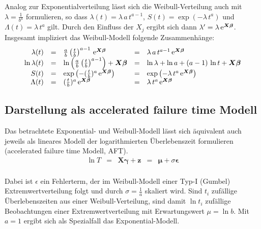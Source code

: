 Analog zur Exponentialverteilung lässt sich die Weibull-Verteilung auch mit $\lambda = \frac{1}{b^{a}}$ formulieren, so dass $\lambda(t) = \lambda \, a \, t^{a-1}$, $S(t) = \exp(-\lambda \, t^{a})$ und $\Lambda(t) = \lambda \, t^{a}$ gilt. Durch den Einfluss der $X_{j}$ ergibt sich dann $\lambda' = \lambda \, {\mathrm{e}}^{\bm{X} \bm{\beta}}$. Insgesamt impliziert das Weibull-Modell folgende Zusammenhänge:
\begin{equation*}
\begin{array}{rclcl}
\lambda(t)     &=& \frac{a}{b} \left(\frac{t}{b}\right)^{a-1} \, {\mathrm{e}}^{\bm{X} \bm{\beta}} &=& \lambda \, a \, t^{a-1} \, {\mathrm{e}}^{\bm{X} \bm{\beta}}\\
\ln \lambda(t) &=& \ln \left(\frac{a}{b} \left(\frac{t}{b}\right)^{a-1}\right) + \bm{X} \bm{\beta} &=& \ln \lambda + \ln a + (a-1) \, \ln t + \bm{X} \bm{\beta}\\
S(t)           &=& \exp\left(-(\frac{t}{b})^{a} \, {\mathrm{e}}^{\bm{X} \bm{\beta}}\right) &=& \exp\left(-\lambda \, t^{a} \, {\mathrm{e}}^{\bm{X} \bm{\beta}}\right)\\
\Lambda(t)     &=& (\frac{t}{b})^{a} \, {\mathrm{e}}^{\bm{X} \bm{\beta}} &=& \lambda \, t^{a} \, {\mathrm{e}}^{\bm{X} \bm{\beta}}
\end{array}
\end{equation*}

\subsection{Darstellung als accelerated failure time Modell}

Das betrachtete Exponential- und Weibull-Modell lässt sich äquivalent auch jeweils als lineares Modell der logarithmierten Überlebenszeit formulieren (accelerated failure time Modell, AFT).
\begin{equation*}
\begin{array}{rclcl}
\ln T &=& \bm{X} \bm{\gamma} + \bm{z} &=& \bm{\mu} + \sigma \bm{\epsilon}\\
\end{array}
\end{equation*}

Dabei ist $\epsilon$ ein Fehlerterm, der im Weibull-Modell einer Typ-I (Gumbel) Extremwertverteilung folgt und durch $\sigma = \frac{1}{a}$ skaliert wird. Sind $t_{i}$ zufällige Überlebenszeiten aus einer Weibull-Verteilung, sind damit $\ln t_{i}$ zufällige Beobachtungen einer Extremwertverteilung mit Erwartungswert $\mu = \ln b$. Mit $a = 1$ ergibt sich als Spezialfall das Exponential-Modell.

